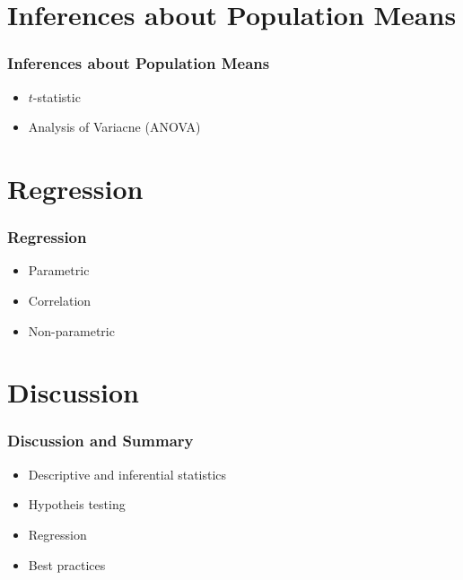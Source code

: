 \documentclass[10pt, compress]{beamer}
\begin{document}
\section{Inferences about Population Means}

\begin{frame}
    \frametitle{Inferences about Population Means}
    \begin{itemize}
        \item $t$-statistic
        \item Analysis of Variacne (ANOVA)
    \end{itemize}
\end{frame}

\section{Regression}

\begin{frame}
    \frametitle{Regression}
    \begin{itemize}
        \item Parametric
        \item Correlation
        \item Non-parametric
    \end{itemize}
\end{frame}

\section{Discussion}

\begin{frame}
    \frametitle{Discussion and Summary}
    \begin{itemize}
        \item Descriptive and inferential statistics
        \item Hypotheis testing
        \item Regression
        \item Best practices
    \end{itemize}
\end{frame}
\end{document}
